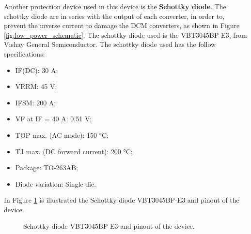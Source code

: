 Another protection device used in this device is the \textbf{Schottky diode}. The schottky diode are in series with the output of each converter, in order to, prevent the inverse current to damage the DCM converters, as shown in Figure \ref{fig:low_power_schematic}. The schottky diode used is the VBT3045BP-E3, from Vishay General Semiconductor. The schottky diode used has the follow specifications:
\begin{itemize}
	\item IF(DC): 30 A;
	\item VRRM: 45 V;
	\item IFSM: 200 A;
	\item VF at IF = 40 A: 0.51 V;
	\item TOP max. (AC mode): 150 °C;
	\item TJ max. (DC forward current): 200 °C;
	\item Package: TO-263AB;
	\item Diode variation: Single die.
\end{itemize}
In Figure \ref{fig:Schottky diode VBT3045BP-E3} is illustrated the Schottky diode VBT3045BP-E3 and pinout of the device.
\begin{center}
	\begin{figure}[!htb]
	  \begin{subfigmatrix}{2}
	  \end{subfigmatrix}
	  \caption{Schottky diode VBT3045BP-E3 and pinout of the device.}
	  \label{fig:Schottky diode VBT3045BP-E3}
	\end{figure}
\end{center}
